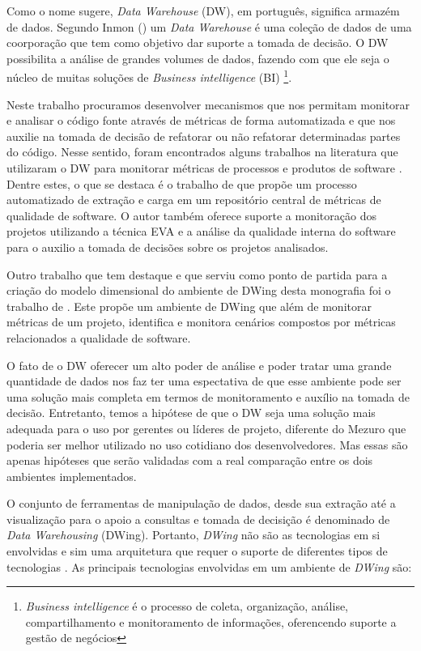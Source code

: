 Como o nome sugere, \emph{Data Warehouse} (DW), em português, significa armazém de dados. Segundo Inmon (\citeyear{inmon2002}) um \emph{Data Warehouse} é uma coleção de dados de uma coorporação que tem como objetivo dar suporte a tomada de decisão. 
%
O DW possibilita a análise de grandes volumes de dados, fazendo com que ele seja o núcleo de muitas soluções de \emph{Business intelligence} (BI)
%
\footnote{\emph{Business intelligence} é o processo de coleta, organização, análise, compartilhamento e monitoramento de informações, oferencendo suporte a gestão de negócios}. 
%

Neste trabalho procuramos desenvolver mecanismos que nos permitam monitorar e analisar o código fonte através de métricas de forma automatizada e que nos auxilie na tomada de decisão de refatorar ou não refatorar determinadas partes do código. 
%
Nesse sentido, foram encontrados alguns trabalhos na literatura que utilizaram o DW para monitorar métricas de processos e produtos de software \cite{Folleco2007} \cite{Silveira2010}\cite{mazuco2011}. Dentre estes, o que se destaca é o trabalho de  \cite{Silveira2010} que propõe um processo automatizado de extração e carga em um repositório central de métricas de qualidade de software. O autor também oferece suporte a monitoração dos projetos utilizando a técnica EVA e a análise da qualidade interna do software para o auxilio a tomada de decisões sobre os projetos analisados. 

Outro trabalho que tem destaque e que serviu como ponto de partida para a criação do modelo dimensional do ambiente de DWing desta monografia foi o trabalho de \cite{rego2014}. Este propõe um ambiente de DWing que além de monitorar métricas de um projeto,  identifica e monitora cenários compostos por métricas relacionados a qualidade de software.

% 
O fato de o DW oferecer um alto poder de análise e poder tratar uma grande quantidade de dados nos faz ter uma espectativa de que esse ambiente pode ser uma solução mais completa em termos de monitoramento e auxílio na tomada de decisão. Entretanto, temos a hipótese de que o DW seja uma solução mais adequada para o uso por gerentes ou líderes de projeto, diferente do Mezuro que poderia ser melhor utilizado no uso cotidiano dos desenvolvedores. Mas essas são apenas hipóteses que serão validadas com a real comparação entre os dois ambientes implementados.

O conjunto de ferramentas de manipulação de dados, desde sua extração até a visualização para o apoio a consultas e tomada de decisição é denominado de \emph{Data Warehousing} (DWing). Portanto,  \emph{DWing} não são as tecnologias em si envolvidas e sim uma arquitetura que requer o suporte de diferentes tipos de tecnologias \cite{inmon2002}.  As principais tecnologias envolvidas em um ambiente de \emph{DWing} são:


